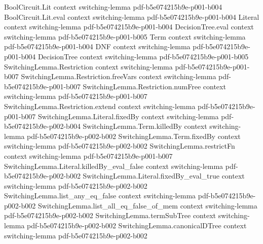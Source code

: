 \begin{lemma}
\label{SwitchingLemma.canonicalDTree_correct}
\leanok
{}
\proofstep
  {BoolCircuit.Lit}
  {context}
  {switching-lemma}
  {pdf-b5e074215b9e-p001-b004}
\proofstep
  {BoolCircuit.Lit.eval}
  {context}
  {switching-lemma}
  {pdf-b5e074215b9e-p001-b004}
\proofstep
  {Literal}
  {context}
  {switching-lemma}
  {pdf-b5e074215b9e-p001-b004}
\proofstep
  {DecisionTree.eval}
  {context}
  {switching-lemma}
  {pdf-b5e074215b9e-p001-b005}
\proofstep
  {Term}
  {context}
  {switching-lemma}
  {pdf-b5e074215b9e-p001-b004}
\proofstep
  {DNF}
  {context}
  {switching-lemma}
  {pdf-b5e074215b9e-p001-b004}
\proofstep
  {DecisionTree}
  {context}
  {switching-lemma}
  {pdf-b5e074215b9e-p001-b005}
\proofstep
  {SwitchingLemma.Restriction}
  {context}
  {switching-lemma}
  {pdf-b5e074215b9e-p001-b007}
\proofstep
  {SwitchingLemma.Restriction.freeVars}
  {context}
  {switching-lemma}
  {pdf-b5e074215b9e-p001-b007}
\proofstep
  {SwitchingLemma.Restriction.numFree}
  {context}
  {switching-lemma}
  {pdf-b5e074215b9e-p001-b007}
\proofstep
  {SwitchingLemma.Restriction.extend}
  {context}
  {switching-lemma}
  {pdf-b5e074215b9e-p001-b007}
\proofstep
  {SwitchingLemma.Literal.fixedBy}
  {context}
  {switching-lemma}
  {pdf-b5e074215b9e-p002-b004}
\proofstep
  {SwitchingLemma.Term.killedBy}
  {context}
  {switching-lemma}
  {pdf-b5e074215b9e-p002-b002}
\proofstep
  {SwitchingLemma.Term.fixedBy}
  {context}
  {switching-lemma}
  {pdf-b5e074215b9e-p002-b002}
\proofstep
  {SwitchingLemma.restrictFn}
  {context}
  {switching-lemma}
  {pdf-b5e074215b9e-p001-b007}
\proofstep
  {SwitchingLemma.Literal.killedBy_eval_false}
  {context}
  {switching-lemma}
  {pdf-b5e074215b9e-p002-b002}
\proofstep
  {SwitchingLemma.Literal.fixedBy_eval_true}
  {context}
  {switching-lemma}
  {pdf-b5e074215b9e-p002-b002}
\proofstep
  {SwitchingLemma.list_any_eq_false}
  {context}
  {switching-lemma}
  {pdf-b5e074215b9e-p002-b002}
\proofstep
  {SwitchingLemma.list_all_eq_false_of_mem}
  {context}
  {switching-lemma}
  {pdf-b5e074215b9e-p002-b002}
\proofstep
  {SwitchingLemma.termSubTree}
  {context}
  {switching-lemma}
  {pdf-b5e074215b9e-p002-b002}
\proofstep
  {SwitchingLemma.canonicalDTree}
  {context}
  {switching-lemma}
  {pdf-b5e074215b9e-p002-b002}

\end{lemma}
